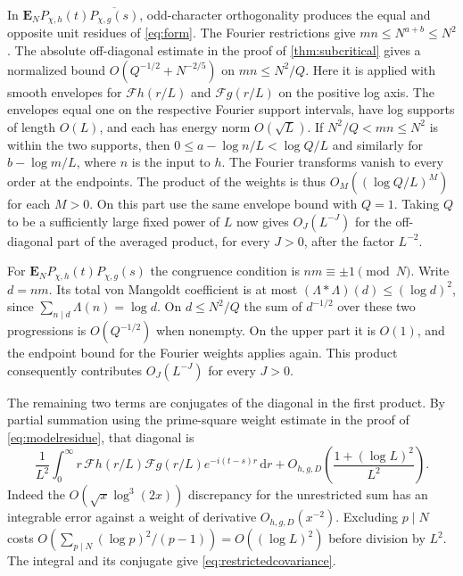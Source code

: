 \documentclass[11pt,a4paper]{article}
\numberwithin{equation}{section}
\newcommand{\ud}{\mathrm d}
\begin{document}
In $\mathbf E_N P_{\chi,h}(t)\overline{P_{\chi,g}(s)}$,
odd-character orthogonality produces the equal and opposite
unit residues of \cref{eq:form}. The Fourier restrictions
give $mn\le N^{a+b}\le N^2$. The absolute off-diagonal
estimate in the proof of \cref{thm:subcritical} gives a
normalized bound $O(Q^{-1/2}+N^{-2/5})$ on $mn\le N^2/Q$.
Here it is applied with smooth envelopes for
$\mathcal Fh(r/L)$ and $\mathcal Fg(r/L)$ on the positive log
axis. The envelopes equal one on the respective Fourier
support intervals, have log supports of length $O(L)$,
and each has energy norm $O(\sqrt L)$.
If $N^2/Q<mn\le N^2$ is within the two supports, then
$0\le a-\log n/L<\log Q/L$ and similarly for $b-\log m/L$,
where $n$ is the input to $h$.
The Fourier transforms vanish to every order at the
endpoints. The product of the weights is thus
$O_M((\log Q/L)^M)$ for each $M>0$.
On this part use the same envelope bound with $Q=1$.
Taking $Q$ to be a sufficiently large fixed power of $L$
now gives $O_J(L^{-J})$ for the off-diagonal part of the
averaged product, for every $J>0$, after the factor $L^{-2}$.

For $\mathbf E_N P_{\chi,h}(t)P_{\chi,g}(s)$ the congruence
condition is $nm\equiv\pm1\pmod N$. Write $d=nm$. Its total
von Mangoldt coefficient is at most $(\Lambda*\Lambda)(d)
\le(\log d)^2$, since $\sum_{n\mid d}\Lambda(n)=\log d$.
On $d\le N^2/Q$ the sum of $d^{-1/2}$ over these two
progressions is $O(Q^{-1/2})$ when nonempty. On the upper
part it is $O(1)$, and the endpoint bound for the Fourier
weights applies again. This product consequently contributes
$O_J(L^{-J})$ for every $J>0$.

The remaining two terms are conjugates of the diagonal
in the first product. By partial summation using the
prime-square weight estimate in the proof of
\cref{eq:modelresidue}, that diagonal is
\[
 \frac1{L^2}\int_0^\infty r\,
    \mathcal Fh(r/L)\mathcal Fg(r/L)e^{-i(t-s)r}\,\ud r
       +O_{h,g,D}\!\left(\frac{1+(\log L)^2}{L^2}\right).
\]
Indeed the $O(\sqrt x\log^3(2x))$ discrepancy for the
unrestricted sum has an integrable error against a weight
of derivative $O_{h,g,D}(x^{-2})$. Excluding $p\mid N$
costs $O(\sum_{p\mid N}(\log p)^2/(p-1))=O((\log L)^2)$
before division by $L^2$. The integral and its conjugate
give \cref{eq:restrictedcovariance}.
\end{document}
